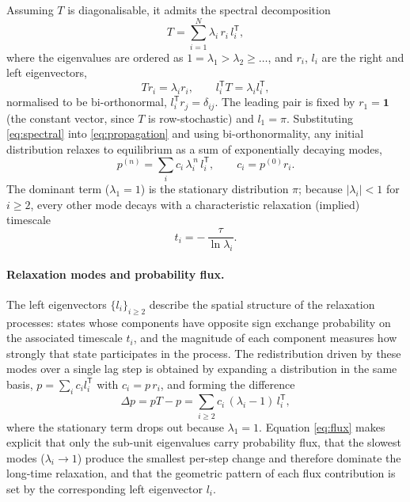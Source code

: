 Assuming $T$ is diagonalisable, it admits the spectral decomposition
\begin{equation}
  T = \sum_{i=1}^{N} \lambda_i\, r_i\, l_i^{\mathsf T},
  \label{eq:spectral}
\end{equation}
where the eigenvalues are ordered as $1 = \lambda_1 > \lambda_2 \geq
\dots$, and $r_i$, $l_i$ are the right and left eigenvectors,
\begin{equation}
  T r_i = \lambda_i r_i, \qquad l_i^{\mathsf T} T = \lambda_i l_i^{\mathsf T},
  \label{eq:eigvecs}
\end{equation}
normalised to be bi-orthonormal, $l_i^{\mathsf T} r_j = \delta_{ij}$.
The leading pair is fixed by $r_1 = \mathbf{1}$ (the constant vector,
since $T$ is row-stochastic) and $l_1 = \pi$. Substituting
\eqref{eq:spectral} into \eqref{eq:propagation} and using
bi-orthonormality, any initial distribution relaxes to equilibrium as a
sum of exponentially decaying modes,
\begin{equation}
  p^{(n)} = \sum_{i} c_i\, \lambda_i^{\,n}\, l_i^{\mathsf T},
  \qquad c_i = p^{(0)} r_i .
  \label{eq:modeexpansion}
\end{equation}
The dominant term ($\lambda_1 = 1$) is the stationary distribution $\pi$;
because $|\lambda_i| < 1$ for $i \geq 2$, every other mode decays with a
characteristic relaxation (implied) timescale
\begin{equation}
  t_i = -\,\frac{\tau}{\ln \lambda_i}.
  \label{eq:timescale}
\end{equation}

\paragraph{Relaxation modes and probability flux.}
The left eigenvectors $\{l_i\}_{i\geq 2}$ describe the spatial structure
of the relaxation processes: states whose components have opposite sign
exchange probability on the associated timescale $t_i$, and the
magnitude of each component measures how strongly that state
participates in the process. The redistribution driven by these modes
over a single lag step is obtained by expanding a distribution in the
same basis, $p = \sum_i c_i l_i^{\mathsf T}$ with $c_i = p\,r_i$, and
forming the difference
\begin{equation}
  \Delta p = pT - p
           = \sum_{i \geq 2} c_i\,(\lambda_i - 1)\, l_i^{\mathsf T},
  \label{eq:flux}
\end{equation}
where the stationary term drops out because $\lambda_1 = 1$. Equation
\eqref{eq:flux} makes explicit that only the sub-unit eigenvalues carry
probability flux, that the slowest modes ($\lambda_i \to 1$) produce the
smallest per-step change and therefore dominate the long-time
relaxation, and that the geometric pattern of each flux contribution is
set by the corresponding left eigenvector $l_i$.

